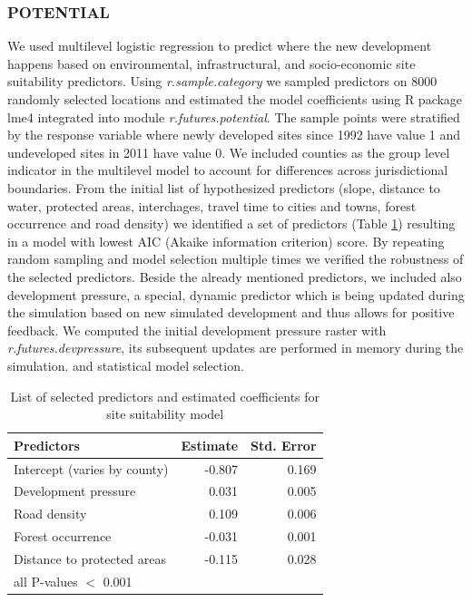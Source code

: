 \documentclass{isprs}
\begin{document}
\subsubsection{POTENTIAL}
We used multilevel logistic regression to predict
where the new development happens based on
environmental, infrastructural, and socio-economic site suitability
predictors. 
Using \emph{r.sample.category} we sampled predictors on 8000 
randomly selected locations and estimated the model coefficients
using R package lme4 integrated into module \emph{r.futures.potential}.
The sample points were stratified by the response variable
where newly developed sites since 1992 have value 1
and undeveloped sites in 2011 have value 0.
We included counties as the group level indicator
in the multilevel model to account for differences
across jurisdictional boundaries.
From the initial list of hypothesized predictors
(slope, distance to water, protected areas, interchages,
travel time to cities and towns, forest occurrence and road density)
we identified a set of predictors (Table \ref{tab:predictors})
resulting in a model with lowest AIC (Akaike information criterion) score.
By repeating random sampling and model selection multiple times
we verified the robustness of the selected predictors.
Beside the already  mentioned predictors, we included also development pressure,
 a special, dynamic predictor which is being
 updated during the simulation based on new simulated development
 and thus allows for positive feedback.
We computed the initial development pressure raster
with \emph{r.futures.devpressure}, its subsequent updates
are performed in memory during the simulation.
and statistical model selection.

\begin{table}[htp]
 \centering
\begin{center}
\begin{tabular}{lrr}
\toprule
Predictors & Estimate{\scriptsize *} & Std. Error \\ \midrule
Intercept (varies by county) & -0.807 & 0.169\\
Development pressure & 0.031 & 0.005\\
Road density & 0.109 & 0.006\\
Forest occurrence& -0.031& 0.001 \\
Distance to protected areas & -0.115 & 0.028\\
\bottomrule
{\scriptsize * all P-values $<$ 0.001}
\end{tabular}
\end{center}
 \caption{List of selected predictors and estimated coefficients
 for site suitability model}
 \label{tab:predictors}
\end{table}
\end{document}

